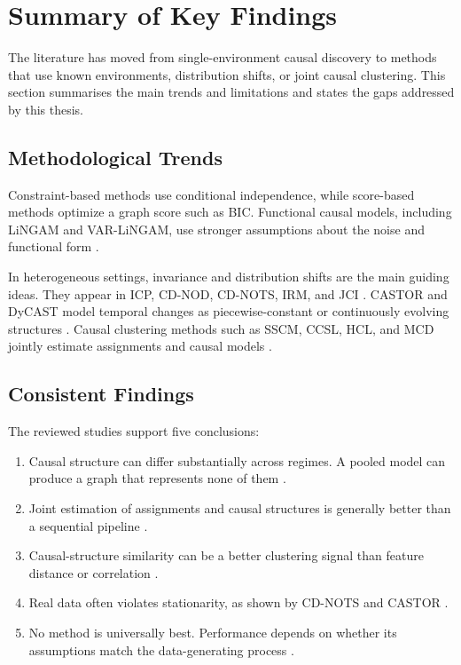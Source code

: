 \section{Summary of Key Findings}
\label{sec:summary}

The literature has moved from single-environment causal discovery to methods that
use known environments, distribution shifts, or joint causal clustering. This
section summarises the main trends and limitations and states the gaps addressed by
this thesis.

\subsection{Methodological Trends}

Constraint-based methods use conditional independence, while score-based methods
optimize a graph score such as BIC. Functional causal models, including LiNGAM and
VAR-LiNGAM, use stronger assumptions about the noise and functional form
\cite{assaad2022survey,shimizu2006lingam,hyvarinen2010estimation}.

In heterogeneous settings, invariance and distribution shifts are the main guiding
ideas. They appear in ICP, CD-NOD, CD-NOTS, IRM, and JCI
\cite{peters2016causal,huang2020causal,sadeghi2025causal,arjovsky2019irm,mooij2020jci}.
CASTOR and DyCAST model temporal changes as piecewise-constant or continuously
evolving structures \cite{rahmani2025castor,cheng2025dycast}. Causal clustering
methods such as SSCM, CCSL, HCL, and MCD jointly estimate assignments and causal
models \cite{huang2019specific,chen2023ccsl,li2025hcl,varambally2024mcd}.

\subsection{Consistent Findings}

The reviewed studies support five conclusions:
\begin{enumerate}[nosep]
\item Causal structure can differ substantially across regimes. A pooled model can
produce a graph that represents none of them
\cite{huang2020causal,chen2023ccsl,varambally2024mcd,li2025hcl,rahmani2025castor}.
\item Joint estimation of assignments and causal structures is generally better than
a sequential pipeline \cite{huang2019specific,chen2023ccsl,li2025hcl,rahmani2025castor}.
\item Causal-structure similarity can be a better clustering signal than feature
distance or correlation \cite{chen2023ccsl}.
\item Real data often violates stationarity, as shown by CD-NOTS and CASTOR
\cite{sadeghi2025causal,rahmani2025castor}.
\item No method is universally best. Performance depends on whether its assumptions
match the data-generating process \cite{assaad2022survey}.
\end{enumerate}

